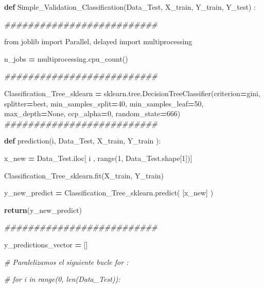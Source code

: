 \documentclass[
  11pt,
  a4paper,
]{article}
\newenvironment{Shaded}{\begin{snugshade}}{\end{snugshade}}
\newcommand{\BuiltInTok}[1]{#1}
\newcommand{\CommentTok}[1]{\textcolor[rgb]{0.56,0.35,0.01}{\textit{#1}}}
\newcommand{\ControlFlowTok}[1]{\textcolor[rgb]{0.13,0.29,0.53}{\textbf{#1}}}
\newcommand{\DecValTok}[1]{\textcolor[rgb]{0.00,0.00,0.81}{#1}}
\newcommand{\ImportTok}[1]{#1}
\newcommand{\KeywordTok}[1]{\textcolor[rgb]{0.13,0.29,0.53}{\textbf{#1}}}
\newcommand{\NormalTok}[1]{#1}
\newcommand{\OperatorTok}[1]{\textcolor[rgb]{0.81,0.36,0.00}{\textbf{#1}}}
\newcommand{\StringTok}[1]{\textcolor[rgb]{0.31,0.60,0.02}{#1}}
\newcommand{\VariableTok}[1]{\textcolor[rgb]{0.00,0.00,0.00}{#1}}
\begin{document}
\begin{Shaded}
\begin{Highlighting}[]
\KeywordTok{def}\NormalTok{ Simple\_Validation\_Classification(Data\_Test, X\_train, Y\_train, Y\_test) :}

    \CommentTok{\#\#\#\#\#\#\#\#\#\#\#\#\#\#\#\#\#\#\#\#\#\#\#\#\#\#}

    \ImportTok{from}\NormalTok{ joblib }\ImportTok{import}\NormalTok{ Parallel, delayed}
    \ImportTok{import}\NormalTok{ multiprocessing}

\NormalTok{    n\_jobs  }\OperatorTok{=}\NormalTok{ multiprocessing.cpu\_count()}

    \CommentTok{\#\#\#\#\#\#\#\#\#\#\#\#\#\#\#\#\#\#\#\#\#\#\#\#\#\#}

\NormalTok{    Classification\_Tree\_sklearn }\OperatorTok{=}\NormalTok{  sklearn.tree.DecisionTreeClassifier(criterion}\OperatorTok{=}\StringTok{\textquotesingle{}gini\textquotesingle{}}\NormalTok{, splitter}\OperatorTok{=}\StringTok{\textquotesingle{}best\textquotesingle{}}\NormalTok{, min\_samples\_split}\OperatorTok{=}\DecValTok{40}\NormalTok{, min\_samples\_leaf}\OperatorTok{=}\DecValTok{50}\NormalTok{,  max\_depth}\OperatorTok{=}\VariableTok{None}\NormalTok{,  ccp\_alpha}\OperatorTok{=}\DecValTok{0}\NormalTok{, random\_state}\OperatorTok{=}\DecValTok{666}\NormalTok{)}
    \CommentTok{\#\#\#\#\#\#\#\#\#\#\#\#\#\#\#\#\#\#\#\#\#\#\#\#\#\#}

    \KeywordTok{def}\NormalTok{ prediction(i, Data\_Test, X\_train, Y\_train ):}

\NormalTok{     x\_new }\OperatorTok{=}\NormalTok{ Data\_Test.iloc[ i , }\BuiltInTok{range}\NormalTok{(}\DecValTok{1}\NormalTok{, Data\_Test.shape[}\DecValTok{1}\NormalTok{])]}

\NormalTok{     Classification\_Tree\_sklearn.fit(X\_train, Y\_train)}

\NormalTok{     y\_new\_predict }\OperatorTok{=}\NormalTok{ Classification\_Tree\_sklearn.predict( [x\_new] ) }
  
     \ControlFlowTok{return}\NormalTok{(y\_new\_predict)}

    \CommentTok{\#\#\#\#\#\#\#\#\#\#\#\#\#\#\#\#\#\#\#\#\#\#\#\#\#\#}

\NormalTok{    y\_predictions\_vector }\OperatorTok{=}\NormalTok{ []}

    \CommentTok{\# Paralelizamos el siguiente bucle for :}

    \CommentTok{\# for i in  range(0, len(Data\_Test)):}


\end{Highlighting}
\end{Shaded}
\end{document}
